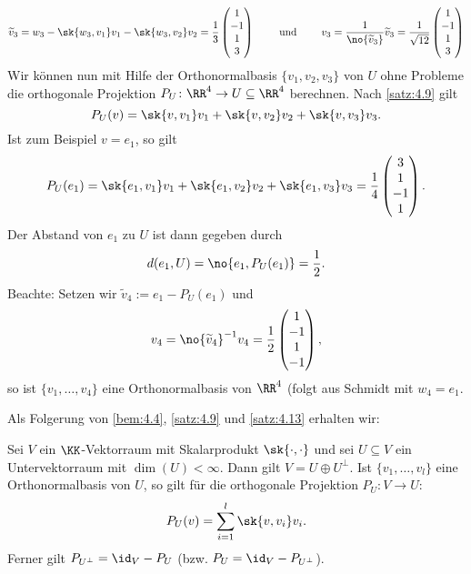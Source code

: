 \begin{beispiel}
\begin{enumerate}[(i)]
\[		\]
		\[
			\widetilde{v}_3 = w_3 - \sk{w_3,v_1} v_1 - \sk{w_3,v_2} v_2 = \frac{1}{3}\begin{pmatrix} 1 \\ -1 \\ 1 \\ 3 \end{pmatrix} \qquad \text{ und } \qquad 
			v_3 = \frac{1}{\no{\widetilde{v}_3}} \widetilde{v}_3 = \frac{1}{\sqrt{12}} \begin{pmatrix} 1 \\ -1 \\ 1 \\ 3 \end{pmatrix}
		\]
		Wir können nun mit Hilfe der Orthonormalbasis $\{v_1,v_2,v_3\}$ von $U$ ohne Probleme die orthogonale Projektion $P_U\colon \RR^4 \rightarrow U \subseteq \RR^4$ berechnen.
		Nach \autoref{satz:4.9} gilt
		\[
			P_U(v) = \sk{v,v_1} v_1 + \sk{v,v_2} v_2 + \sk{v,v_3} v_3.
		\]
		Ist zum Beispiel $v = e_1$, so gilt
		\[
			P_U(e_1) = \sk{e_1,v_1} v_1 + \sk{e_1,v_2} v_2 + \sk{e_1,v_3} v_3 =
			\frac{1}{4} \begin{pmatrix} 3 \\ 1 \\ -1 \\ 1 \end{pmatrix}.
		\]
		Der Abstand von $e_1$ zu $U$ ist dann gegeben durch
		\[
			d(e_1,U) = \no{e_1,P_U(e_1)} = \frac{1}{2}.
		\]
		Beachte: Setzen wir $\widetilde{v}_4 := e_1 - P_U(e_1)$ und
		\[
			v_4 = \no{\widetilde{v}_4}^{-1} v_4 = \frac{1}{2} \begin{pmatrix}
			1 \\ -1 \\ 1 \\ -1
			\end{pmatrix},
		\]
		so ist $\{v_1,\dots,v_4\}$ eine Orthonormalbasis von $\RR^4$ (folgt aus Schmidt mit $w_4 = e_1$.
	\end{enumerate}
\end{beispiel}

Als Folgerung von \autoref{bem:4.4}, \autoref{satz:4.9} und \autoref{satz:4.13} erhalten wir:
\begin{satz}
	\label{satz:4.16}
	Sei $V$ ein $\KK$-Vektorraum mit Skalarprodukt $\sk{\cdot,\cdot}$ und sei $U \subseteq V$ ein Untervektorraum mit $\dim(U) < \infty$.
	Dann gilt $V = U \oplus U^\perp$.
	Ist $\{v_1,\dots,v_l\}$ eine Orthonormalbasis von $U$, so gilt für die orthogonale Projektion $P_U \colon V \rightarrow U$:
	\[
		P_U(v) = \sum\limits_{i=1}^{l} \sk{v,v_i} v_i.
	\]
	Ferner gilt $P_{U^\perp} = \id_V - P_U$ (bzw. $P_U = \id_V - P_{U^\perp}$).
\end{satz}

